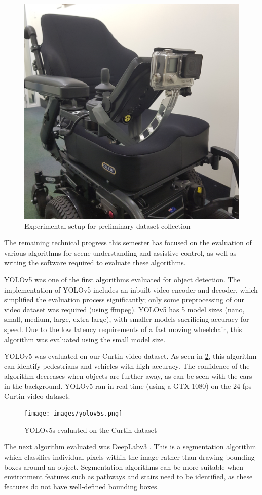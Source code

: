 \documentclass[12pt]{article}
\begin{document}
\begin{figure}[bp]
    \centering
    \includegraphics[width=0.45\linewidth,angle=270,origin=c]{images/gopro_dataset_collection.jpg}
    \caption{Experimental setup for preliminary dataset collection}
    \label{fig:gopro_dataset_collection}
\end{figure}

The remaining technical progress this semester has focused on the evaluation of various algorithms for scene understanding
and assistive control, as well as writing the software required to evaluate these algorithms.

YOLOv5 \cite{ultralyticsYOLOv5} was one of the first algorithms evaluated for object detection.
The implementation of YOLOv5 includes an inbuilt video encoder and decoder, which simplified
the evaluation process significantly; only some preprocessing of our video dataset was required (using ffmpeg).
YOLOv5 has 5 model sizes (nano, small, medium, large, extra large),
with smaller models sacrificing accuracy for speed.
Due to the low latency requirements of a fast moving wheelchair, this algorithm was evaluated using the small model size.

YOLOv5 was evaluated on our Curtin video dataset. As seen in \cref{fig:yolov5s}, this algorithm can identify pedestrians and vehicles with high accuracy.
The confidence of the algorithm decreases when objects are further away, as can be seen with the cars in the background.
YOLOv5 ran in real-time (using a GTX 1080) on the 24 fps Curtin video dataset.

\begin{figure}[H]
    \centering
    \texttt{[image: images/yolov5s.png]}
    \caption{YOLOv5s evaluated on the Curtin dataset}
    \label{fig:yolov5s}
\end{figure}

The next algorithm evaluated was DeepLabv3 \cite{chenRethinkingAtrousConvolution2017}. This is a segmentation algorithm
which classifies individual pixels within the image rather than drawing bounding boxes around an object.
Segmentation algorithms can be more suitable when environment features such as pathways and stairs need to be identified,
as these features do not have well-defined bounding boxes.
\end{document}
